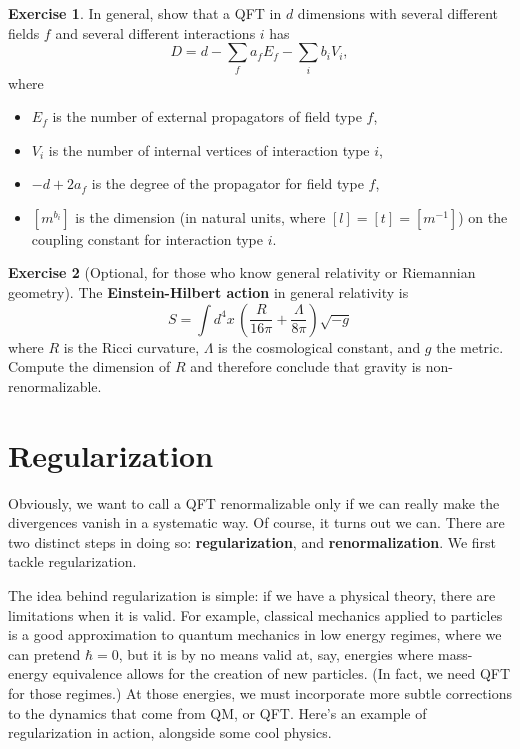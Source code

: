 \documentclass{report}
\theoremstyle{plain}
\theoremstyle{definition}
\newtheorem{exercise}{Exercise}[section]
\theoremstyle{remark}
\begin{document}
\begin{exercise}
  In general, show that a QFT in $d$ dimensions with several different
  fields $f$ and several different interactions $i$ has
  $$ D = d - \sum_f a_f E_f - \sum_i b_i V_i, $$
  where
  \begin{itemize}
  \item $E_f$ is the number of external propagators of field type $f$,
  \item $V_i$ is the number of internal vertices of interaction type $i$,
  \item $-d + 2a_f$ is the degree of the propagator for field type $f$,
  \item $[m^{b_i}]$ is the dimension (in natural units, where
    $[l] = [t] = [m^{-1}]$) on the coupling constant for interaction
    type $i$.
  \end{itemize}
\end{exercise}

\begin{exercise}[Optional, for those who know general relativity or
  Riemannian geometry]
  The {\bf Einstein-Hilbert action} in general relativity is
  $$ S = \int d^4x \, \left(\frac{R}{16\pi} + \frac{\Lambda}{8\pi}\right) \sqrt{-g} $$
  where $R$ is the Ricci curvature, $\Lambda$ is the cosmological
  constant, and $g$ the metric. Compute the dimension of $R$ and
  therefore conclude that gravity is non-renormalizable.
\end{exercise}

\section{Regularization}

Obviously, we want to call a QFT renormalizable only if we can really
make the divergences vanish in a systematic way. Of course, it turns
out we can. There are two distinct steps in doing so: {\bf
  regularization}, and {\bf renormalization}. We first tackle
regularization.

The idea behind regularization is simple: if we have a physical
theory, there are limitations when it is valid. For example, classical
mechanics applied to particles is a good approximation to quantum
mechanics in low energy regimes, where we can pretend $\hbar = 0$, but
it is by no means valid at, say, energies where mass-energy
equivalence allows for the creation of new particles. (In fact, we
need QFT for those regimes.) At those energies, we must incorporate
more subtle corrections to the dynamics that come from QM, or QFT.
Here's an example of regularization in action, alongside some cool
physics.
\end{document}
